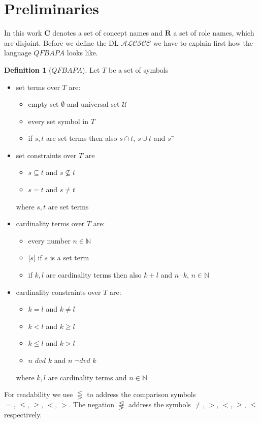 \documentclass[a4paper,11pt]{scrartcl}
\theoremstyle{break}
\theoremstyle{definition}
\newtheorem{mydef}{Definition}
\begin{document}
\section{Preliminaries}
In this work $\mathbf{C}$ denotes a set of concept names and $\mathbf{R}$ a set of role names, which are disjoint. Before we define the DL $\mathcal{ALCSCC}$ we have to explain first how the language $QFBAPA$ looks like.
\begin{mydef}[$QFBAPA$]
Let $T$ be a set of symbols
\begin{itemize}
\item set terms over $T$ are:
\begin{itemize}
\item empty set $\emptyset$ and universal set $
\mathcal{U}$
\item every set symbol in $T$
\item if $s,t$ are set terms then also $s\cap t$, $s\cup t$ and $s^{\neg}$
\end{itemize}
\item set constraints over $T$ are
\begin{itemize}
\item $s\subseteq t$ and $s\not\subseteq t$
\item $s=t$ and $s\neq t$
\end{itemize}
where $s,t$ are set terms
\item cardinality terms over $T$ are:
\begin{itemize}
\item every number $n\in \mathbb{N}$
\item $|s|$ if $s$ is a set term
\item if $k,l$ are cardinality terms then also $k+l$ and $n\cdot k$, $n\in \mathbb{N}$
\end{itemize}
\item cardinality constraints over $T$ are:
\begin{itemize}
\item $k=l$ and $k\neq l$
\item $k<l$ and $k\geq l$
\item $k\leq l$ and $k>l$
\item $n$ $dvd$ $k$ and $n$ $\neg dvd$ $k$
\end{itemize}
where $k,l$ are cardinality terms and $n\in\mathbb{N}$
\end{itemize}
\end{mydef}
For readability we use $\lesseqgtr$ to address the comparison symbols $=,\,\leq,\,\geq,\,<,\,>$. The negation $\not\lesseqgtr$ address the symbols $\neq,\,>,\,<,\,\geq,\,\leq$ respectively.\\
\end{document}
